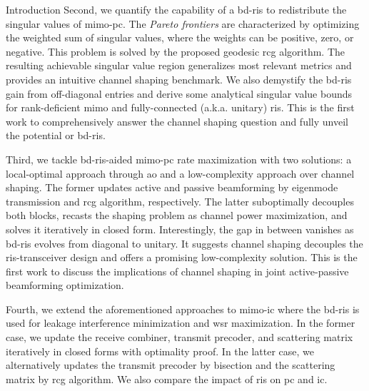 \begin{section}{Introduction}
	Second, we quantify the capability of a \gls{bd}-\gls{ris} to redistribute the singular values of \gls{mimo}-\gls{pc}.
	The \emph{Pareto frontiers} are characterized by optimizing the {weighted sum of singular values}, where the weights can be positive, zero, or negative.
	This problem is solved by the proposed geodesic \gls{rcg} algorithm.
	The resulting achievable singular value region generalizes most relevant metrics and provides an intuitive channel shaping benchmark.
	We also demystify the \gls{bd}-\gls{ris} gain from off-diagonal entries and derive some analytical singular value bounds for rank-deficient \gls{mimo} and fully-connected (a.k.a. unitary) \gls{ris}.
	This is the first work to comprehensively answer the channel shaping question and fully unveil the potential or \gls{bd}-\gls{ris}.

	Third, we tackle \gls{bd}-\gls{ris}-aided \gls{mimo}-\gls{pc} rate maximization with two solutions: a local-optimal approach through \gls{ao} and a low-complexity approach over channel shaping.
	The former updates active and passive beamforming by eigenmode transmission and \gls{rcg} algorithm, respectively.
	The latter suboptimally decouples both blocks, recasts the shaping problem as channel power maximization, and solves it iteratively in closed form.
	Interestingly, the gap in between vanishes as \gls{bd}-\gls{ris} evolves from diagonal to unitary.
	It suggests channel shaping decouples the \gls{ris}-transceiver design and offers a promising low-complexity solution.
	This is the first work to discuss the implications of channel shaping in joint active-passive beamforming optimization.

	Fourth, we extend the aforementioned approaches to \gls{mimo}-\gls{ic} where the \gls{bd}-\gls{ris} is used for leakage interference minimization and \gls{wsr} maximization.
	In the former case, we update the receive combiner, transmit precoder, and scattering matrix iteratively in closed forms with optimality proof.
	In the latter case, we alternatively updates the transmit precoder by bisection and the scattering matrix by \gls{rcg} algorithm.
	We also compare the impact of \gls{ris} on \gls{pc} and \gls{ic}.





\end{section}


